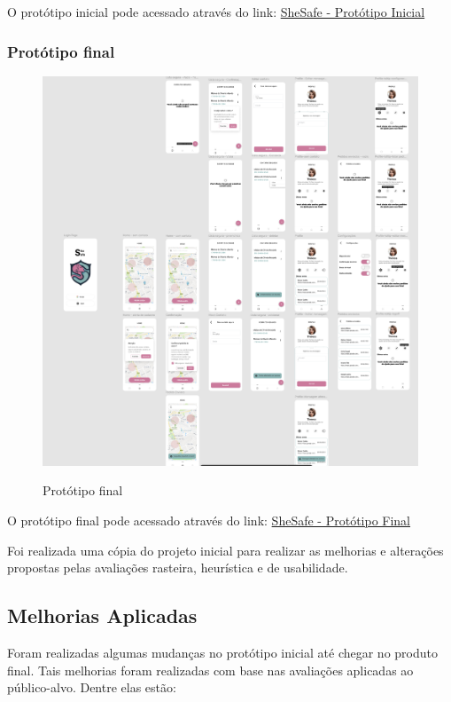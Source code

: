 O protótipo inicial pode acessado através do link: \href{https://www.figma.com/proto/ZOxt5eHuQt0RjhagaDpuXU/SheSafe?type=design&node-id=26-369&viewport=1892%2C1064%2C0.71&t=gZiNpzVt2mGhuMDV-0&scaling=min-zoom&starting-point-node-id=26%3A653}{SheSafe - Protótipo Inicial}

\subsubsection{Protótipo final}
\begin{figure}[h]
	\begin{center}
		\includegraphics[width=0.7\linewidth]{images/prototipo-final.png}\\
	\end{center}
	\caption[Protótipo final]{Protótipo final}
	\label{fig:prototipo-final}
\end{figure}
\pagebreak
O protótipo final pode acessado através do link: \href{https://www.figma.com/proto/GALwTZKTsmvOVWX4JARmOB/SheSafe-Corrigido?node-id=26-653&viewport=2654%2C786%2C0.79&t=dkVCQTw83BbPw3KK-0&scaling=min-zoom&starting-point-node-id=26%3A653}{SheSafe - Protótipo Final}

Foi realizada uma cópia do projeto inicial para realizar as melhorias e alterações propostas pelas avaliações rasteira, heurística e de usabilidade.

\subsection{Melhorias Aplicadas}
Foram realizadas algumas mudanças no protótipo inicial até chegar no produto final. Tais melhorias foram realizadas com base nas avaliações aplicadas ao público-alvo. Dentre elas estão:

